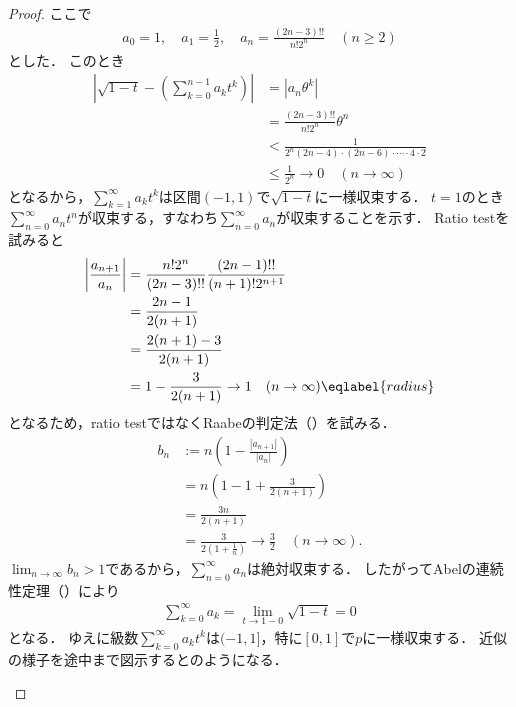 \documentclass[../main.tex]{subfiles}
\begin{document}
\begin{proof}
ここで
\begin{align*}
  a_0 = 1,\quad a_1 = \frac{1}{2},\quad a_n = \frac{(2n - 3)!!}{n!2^n}\quad (n \geq 2)
\end{align*}
とした．
このとき
\begin{align*}
\left|\sqrt{1 - t} - \left(\sum_{k = 0}^{n -1} a_k t^k \right)\right|
  &= \left| a_n \theta^k \right| \\
  &= \frac{(2n - 3)!!}{n!2^n} \theta^n  \\
  &< \frac{1}{2^n (2n - 4) \cdot (2n - 6) \cdot \cdots \cdot 4 \cdot 2}  \\
  &\leq \frac{1}{2^n} \to 0 \quad(n \to \infty)
\end{align*}
となるから，\(\sum_{k = 1}^\infty a_k t^k\)は区間\((-1, 1)\)で\(\sqrt{1 - t}\)に一様収束する．
\(t = 1\)のとき\(\sum_{n = 0}^\infty a_n t^n\)が収束する，すなわち\(\sum_{n = 0}^\infty a_n\)が収束することを示す．
Ratio testを試みると
\begin{align}
  \left| \frac{a_{n + 1}}{a_n } \right|
  &=  \frac{n!2^n}{(2n - 3)!!} \frac{(2n - 1)!!}{(n + 1)!2^{n + 1}} \notag \\
  &=  \frac{2n - 1}{2(n + 1)} \notag \\
  &=  \frac{2(n + 1) - 3}{2(n + 1)} \notag \\
  &= 1 - \frac{3}{2(n + 1)} \to 1 \quad(n \to \infty) \eqlabel{radius}
\end{align}
となるため，ratio testではなくRaabeの判定法（）を試みる．
\begin{align*}
b_n
&:= n \left(1 - \frac{|a_{n + 1}|}{|a_n|}\right) \\
&= n \left(1 - 1 + \frac{3}{2(n + 1)}\right) \\
&= \frac{3 n}{2(n + 1)} \\
&= \frac{3}{\displaystyle 2\left(1 + \frac{1}{n}\right)} \to \frac{3}{2} \quad(n \to \infty).
\end{align*}
\(\lim_{n \to \infty} b_n > 1\)であるから，\(\sum_{n = 0}^\infty a_n\)は絶対収束する．
したがってAbelの連続性定理（）により
\begin{align*}
  \sum_{k = 0}^\infty a_k = \lim_{t \to 1 - 0}\sqrt{1 - t} = 0
\end{align*}
となる．
ゆえに級数\(\sum_{k = 0}^\infty a_k t^k\)は\((-1, 1]\)，特に\([0, 1]\)で\(p\)に一様収束する．
近似の様子を途中まで図示するとのようになる．
\begin{figure}
    \centering
    \begin{tikzpicture}

\end{tikzpicture}
\end{figure}
\end{proof}
\end{document}

